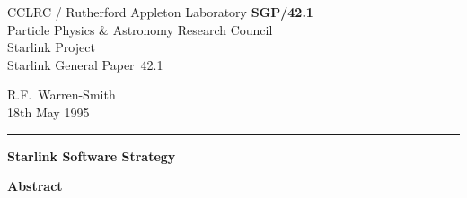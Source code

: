 \documentclass[twoside,11pt]{article}
\newcommand{\stardoccategory}  {Starlink General Paper}
\newcommand{\stardocinitials}  {SGP}
\newcommand{\stardocnumber}    {42.1}
\newcommand{\stardocauthors}   {R.F.~Warren-Smith}
\newcommand{\stardocdate}      {18th May 1995}
\newcommand{\stardoctitle}     {Starlink Software Strategy}
\newcommand{\stardocname}{\stardocinitials /\stardocnumber}
\newenvironment{latexonly}{}{}
\begin{document}
\thispagestyle{empty}

\begin{latexonly}
   CCLRC / {\sc Rutherford Appleton Laboratory} \hfill {\bf \stardocname}\\
   {\large Particle Physics \& Astronomy Research Council}\\
   {\large Starlink Project\\}
   {\large \stardoccategory\ \stardocnumber}
   \begin{flushright}
   \stardocauthors\\
   \stardocdate
   \end{flushright}
   \vspace{-4mm}
   \rule{\textwidth}{0.5mm}
   \vspace{5mm}
   \begin{center}
   {\Large\bf \stardoctitle}
   \end{center}
   \vspace{5mm}

   \vspace{10mm}
   \begin{center}
      {\Large\bf Abstract}
   \end{center}
\end{latexonly}
\end{document}
